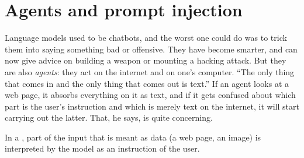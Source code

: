 
\section{Agents and prompt injection}\label{sec:L8-injection}
Language models used to be chatbots, and the worst one could do was to trick them into saying something bad or offensive. They have become smarter, and can now give advice on building a weapon or mounting a hacking attack. But they are also \emph{agents}: they act on the internet and on one's computer. ``The only thing that comes in and the only thing that comes out is text.'' If an agent looks at a web page, it absorbs everything on it as text, and if it gets confused about which part is the user's instruction and which is merely text on the internet, it will start carrying out the latter. That, he says, is quite concerning.

\begin{defn}\label{def:L8-pi}
In a , part of the input that is meant as data (a web page, an image) is interpreted by the model as an instruction of the user.
\end{defn}

